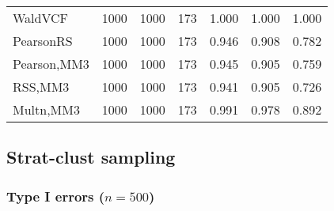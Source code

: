 \documentclass[
]{article}
\begin{document}
\begin{table}[H]
{\begin{tabular}[t]{lrrrrrr}
\hspace{1em}WaldVCF & 1000 & 1000 & 173 & 1.000 & 1.000 & 1.000\\
\hspace{1em}PearsonRS & 1000 & 1000 & 173 & 0.946 & 0.908 & 0.782\\
\hspace{1em}Pearson,MM3 & 1000 & 1000 & 173 & 0.945 & 0.905 & 0.759\\
\hspace{1em}RSS,MM3 & 1000 & 1000 & 173 & 0.941 & 0.905 & 0.726\\
\hspace{1em}Multn,MM3 & 1000 & 1000 & 173 & 0.991 & 0.978 & 0.892\\
\bottomrule
\end{tabular}}
\endgroup{}
\end{table}

\hypertarget{strat-clust-sampling}{%
\subsection{Strat-clust sampling}\label{strat-clust-sampling}}

\hypertarget{type-i-errors-n500-3}{%
\subsubsection{\texorpdfstring{Type I errors
(\(n=500\))}{Type I errors (n=500)}}\label{type-i-errors-n500-3}}
\end{document}
